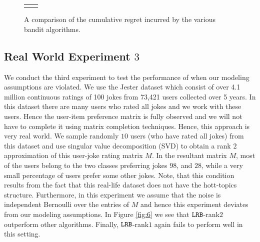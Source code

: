 \begin{figure}[!th]
\begin{tabular}{cc}
{  		\label{fig:4}
    }
    \end{tabular}
    \caption{A comparison of the cumulative regret incurred by the various bandit algorithms. }
    \label{fig:karmed1}
    \vspace*{-1em}
\end{figure}


\subsection{Real World Experiment $3$}
We conduct the third experiment to test the performance of \latentranker when our modeling assumptions are violated. We use the Jester dataset \citep{goldberg2001eigentaste} which consist of over 4.1 million continuous ratings of 100 jokes from 73,421 users collected over 5 years. In this dataset there are many users who rated all jokes and we work with these users. Hence the user-item preference matrix is fully observed and we will not have to complete it using matrix completion techniques. Hence, this approach is very real world. We sample randomly $10$ users (who have rated all jokes) from this dataset and use singular value decomposition (SVD) to obtain a rank $2$ approximation of this user-joke rating matrix $M$. In the resultant matrix $M$, most of the users belong to the two classes preferring jokes $98$, and $28$, while a very small percentage of users prefer some other jokes. Note, that this condition results from the fact that this real-life dataset does not have the hott-topics structure. Furthermore, in this experiment we assume that the noise is independent Bernoulli over the entries of $M$ and hence this experiment deviates from our modeling assumptions. In Figure \ref{fig:6}  we see that ${\tt LRB}$-rank$2$ outperform other algorithms. Finally, ${\tt LRB}$-rank$1$ again fails to perform well in this setting.
